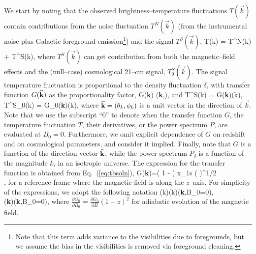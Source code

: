 We start by noting that the observed brightness--temperature fluctuations $T(\vec k)$ contain contributions from the noise fluctuation $T^N(\vec k)$ (from the instrumental noise plus Galactic foreground emission\footnote{Note that this term adds variance to the visibilities due to foregrounds, but we assume the bias in the visibilities is removed via foreground cleaning.}) and the signal $T^S(\vec k)$, 
\beq
\bga
T(\vec k) = T^N(\vec k) + T^S(\vec k),
\ega
\label{eq:Ttot}
\eeq
where $T^S(\vec k)$ can get contribution from both the magnetic--field effects and the (null--case) cosmological 21--cm signal, $T^S_0(\vec k)$. The signal temperature fluctuation is proportional to the density fluctuation $\delta$, with transfer function $G({\bf{\widehat k}})$ as the proportionality factor, 
\beq
\bga
G({\bf{\widehat k}}) \equiv {}({\bf{\widehat k}},),
\ega
\eeq
and
\beq
\bga
T^S(\vec k) = G({\bf{\widehat k}})\delta(k),\\
T^S_0(\vec k) = G_0({\bf{\widehat k}})\delta(k),
\ega
\label{eq:def_G}
\eeq
where ${\bf{\widehat k}}=(\theta_k,\phi_k)$ is a unit vector in the direction of $\vec k$. Note that we use the subscript ``0'' to denote when the transfer function $G$, the temperature fluctuation $T$, their derivatives, or the power spectrum $P$, are evaluated at $B_0=0$. Furthermore, we omit explicit dependence of $G$ on redshift and on cosmological parameters, and consider it implied. Finally, note that $G$ is a function of the direction vector ${\bf{\widehat k}}$, while the power spectrum $P_\delta$ is a function of the magnitude $k$, in an isotropic universe. The expression for the transfer function is obtained from Eq.~(\ref{eq:tbsoln}),
\beq
\bga
G({\bf{\widehat k}})=\left( 1 -  \right) x_{1{\rm s}} \left(  \right)^{1/2} \\
\times {} ,
\label{eq:G_def}
\ega
\eeq
for a reference frame where the magnetic field is along the $z$--axis.
For simplicity of the expressions, we adopt the following notation
\beq
\bga
{}(\vec k)\equiv  \delta(k)({\bf{\widehat k}},B_0=0),\\
({\bf{\widehat k}})\equiv{}({\bf{\widehat k}},B_0=0),
\ega
\label{eq:dTdB_dGdB}
\eeq
where $\frac{\partial G_0}{\partial B_0}=\frac{\partial G_0}{\partial B} (1+z)^2$ for adiabatic evolution of the magnetic field. 

